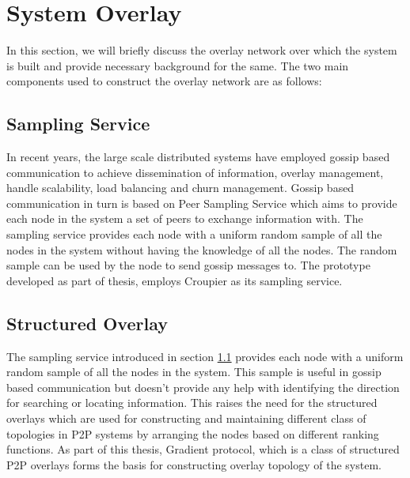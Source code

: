 \documentclass[a4paper,11pt]{kth-mag}
\begin{document}
\section{System Overlay}
In this section, we will briefly discuss the overlay network over which the system is built and provide necessary background for the same. The two main components used to construct the overlay network are as follows:

\subsection{Sampling Service}
\label{ssec:sampling}

In recent years, the large scale distributed systems have employed gossip based communication to achieve dissemination of information, overlay management, handle scalability, load balancing and churn management. Gossip based communication in turn is based on Peer Sampling Service\cite{samplingService} which aims to provide each node in the system a set of peers to exchange information with.  The sampling service provides each node with a uniform random sample of all the nodes in the system without having the knowledge of all the nodes. The random sample can be used by the node to send gossip messages to. The prototype developed as part of thesis, employs Croupier\cite{croupier} as its sampling service.


\subsection{Structured Overlay}

The sampling service introduced in section \ref{ssec:sampling} provides each node with a uniform random sample of all the nodes in the system. This sample is useful in gossip based communication but doesn't provide any help with identifying the direction for searching or locating information. This raises the need for the structured overlays\cite{tMan}\cite{sacha2006discovery} which are used for constructing and maintaining different class of topologies in P2P systems by arranging the nodes based on different ranking functions. As part of this thesis, Gradient\cite{sacha2006discovery} protocol, which is a class of structured P2P overlays forms the basis for constructing overlay topology of the system.
\end{document}
